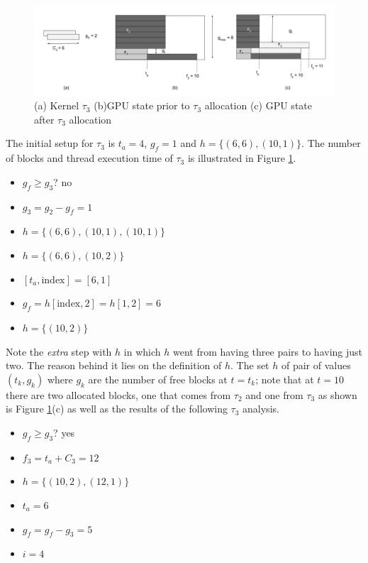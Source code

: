 \documentclass[
  12pt,
  a4paperpaper,
]{report}
\providecommand{\tightlist}{%
  \setlength{\itemsep}{0pt}\setlength{\parskip}{0pt}}
\begin{document}
\begin{figure}
\centering
\includegraphics{source/figures/ex_3.jpg}
\caption{(a) Kernel \(\tau_3\) (b)GPU state prior to \(\tau_3\)
allocation (c) GPU state after \(\tau_3\) allocation \label{img:ex_3}}
\end{figure}

The initial setup for \(\tau_3\) is \(t_a = 4\), \(g_f= 1\) and
\(h = \{ (6,6),(10,1) \}\). The number of blocks and thread execution
time of \(\tau_3\) is illustrated in Figure \ref{img:ex_3}.

\begin{itemize}
\tightlist
\item
  \(g_f \geq g_3\)? no
\item
  \(g_3 = g_2 - g_f = 1\)
\item
  \(h = \{ (6,6), (10,1), (10,1) \}\)
\item
  \(h = \{ (6,6), (10,2) \}\)
\item
  \([ t_a, \mathrm{index} ] = [6,1]\)
\item
  \(g_f = h[ \mathrm{index},2] = h[1,2] = 6\)
\item
  \(h = \{(10,2)\}\)
\end{itemize}

Note the \emph{extra} step with \(h\) in which
\(h\) went from having three pairs to having just two. The reason behind
it lies on the definition of \(h\). The set \(h\) of pair of values
\((t_k, g_k)\) where \(g_k\) are the number of free blocks at \(t=t_k\);
note that at \(t=10\) there are two allocated blocks, one
that comes from \(\tau_2\) and one from \(\tau_3\) as shown is Figure
\ref{img:ex_3}(c) as well as the results of the following \(\tau_3\)
analysis.

\begin{itemize}
\tightlist
\item
  \(g_f \geq g_3\)? yes
\item
  \(f_3 = t_a + C_3 = 12\)
\item
  \(h = \{ (10,2),(12,1) \}\)
\item
  \(t_a = 6\)
\item
  \(g_f = g_f - g_3 = 5\)
\item
  \(i = 4\)
\end{itemize}
\end{document}
